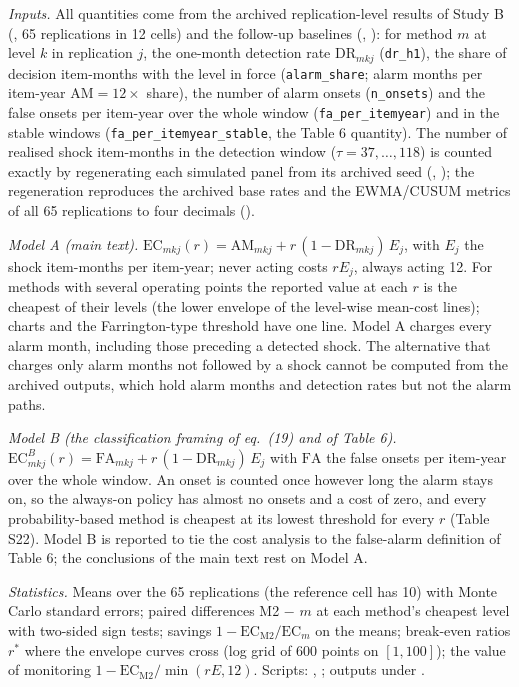 \textit{Inputs.} All quantities come from the archived replication-level results of Study B (, 65 replications in 12 cells) and the follow-up baselines (, ): for method $m$ at level $k$ in replication $j$, the one-month detection rate $\mathrm{DR}_{mkj}$ (\texttt{dr\_h1}), the share of decision item-months with the level in force (\texttt{alarm\_share}; alarm months per item-year $\mathrm{AM} = 12\times$ share), the number of alarm onsets (\texttt{n\_onsets}) and the false onsets per item-year over the whole window (\texttt{fa\_per\_itemyear}) and in the stable windows (\texttt{fa\_per\_itemyear\_stable}, the Table 6 quantity). The number of realised shock item-months in the detection window ($\tau = 37,\dots,118$) is counted exactly by regenerating each simulated panel from its archived seed (, ); the regeneration reproduces the archived base rates and the EWMA/CUSUM metrics of all 65 replications to four decimals ().

\textit{Model A (main text).} $\mathrm{EC}_{mkj}(r) = \mathrm{AM}_{mkj} + r\,(1-\mathrm{DR}_{mkj})\,E_{j}$, with $E_{j}$ the shock item-months per item-year; never acting costs $rE_{j}$, always acting 12. For methods with several operating points the reported value at each $r$ is the cheapest of their levels (the lower envelope of the level-wise mean-cost lines); charts and the Farrington-type threshold have one line. Model A charges every alarm month, including those preceding a detected shock. The alternative that charges only alarm months not followed by a shock cannot be computed from the archived outputs, which hold alarm months and detection rates but not the alarm paths.

\textit{Model B (the classification framing of eq.\ (19) and of Table 6).} $\mathrm{EC}^{B}_{mkj}(r) = \mathrm{FA}_{mkj} + r\,(1-\mathrm{DR}_{mkj})\,E_{j}$ with $\mathrm{FA}$ the false onsets per item-year over the whole window. An onset is counted once however long the alarm stays on, so the always-on policy has almost no onsets and a cost of zero, and every probability-based method is cheapest at its lowest threshold for every $r$ (Table S22). Model B is reported to tie the cost analysis to the false-alarm definition of Table 6; the conclusions of the main text rest on Model A.

\textit{Statistics.} Means over the 65 replications (the reference cell has 10) with Monte Carlo standard errors; paired differences M2 $-$ $m$ at each method's cheapest level with two-sided sign tests; savings $1 - \mathrm{EC}_{\mathrm{M2}}/\mathrm{EC}_{m}$ on the means; break-even ratios $r^{*}$ where the envelope curves cross (log grid of 600 points on $[1, 100]$); the value of monitoring $1 - \mathrm{EC}_{\mathrm{M2}} / \min(rE, 12)$. Scripts: , ; outputs under .

